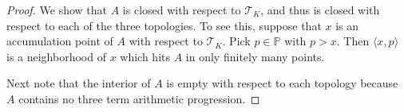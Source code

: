 \documentclass{amsart}
\theoremstyle{definition}
\newcommand{\I}{\mathcal I}
\newcommand{\T}{\mathcal{T}}
\newcommand{\B}{\mathcal{B}}
\newcommand{\arithseq}[2]{\langle#2, #1\rangle}
\begin{document}
%
%
\begin{proof}
We show that $A$ is closed with respect to $\T_K$, and thus
is closed with respect to each of the three topologies. To see this, suppose
that $x$ is an accumulation point of $A$ with respect to $\T_K$. 
Pick $p\in\mathbb{P}$ with $p > x$. Then $\arithseq{p}{x}$ is a 
neighborhood of $x$ which hits $A$ in only finitely many points.

  Next note that the interior of $A$ is empty with respect to each 
topology because $A$ contains no three term arithmetic progression.
\end{proof}
\end{document}
